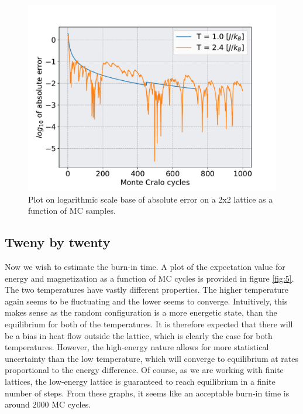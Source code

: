 \documentclass[english,notitlepage,reprint,nofootinbib]{revtex4-1}  %
\begin{document}
\begin{figure}[h!]
    \centering %
    \includegraphics[scale=0.35]{figures/4c.pdf} %
    \caption{Plot on logarithmic scale base of absolute error on a 2x2 lattice as a function of MC samples.}
    \label{fig:4c}
\end{figure}


\subsection{Tweny by twenty}

Now we wish to estimate the burn-in time. A plot of the expectation value for energy and magnetization as a function of MC cycles is provided in figure \ref{fig:5}. The two temperatures have vastly different properties. The higher temperature again seems to be fluctuating and the lower seems to converge. Intuitively, this makes sense as the random configuration is a more energetic state, than the equilibrium for both of the temperatures. It is therefore expected that there will be a bias in heat flow outside the lattice, which is clearly the case for both temperatures. However, the high-energy nature allows for more statistical uncertainty than the low temperature, which will converge to equilibrium at rates proportional to the energy difference. Of course, as we are working with finite lattices, the low-energy lattice is guaranteed to reach equilibrium in a finite number of steps. From these graphs, it seems like an acceptable burn-in time is around $2000$ MC cycles. 
\end{document}
